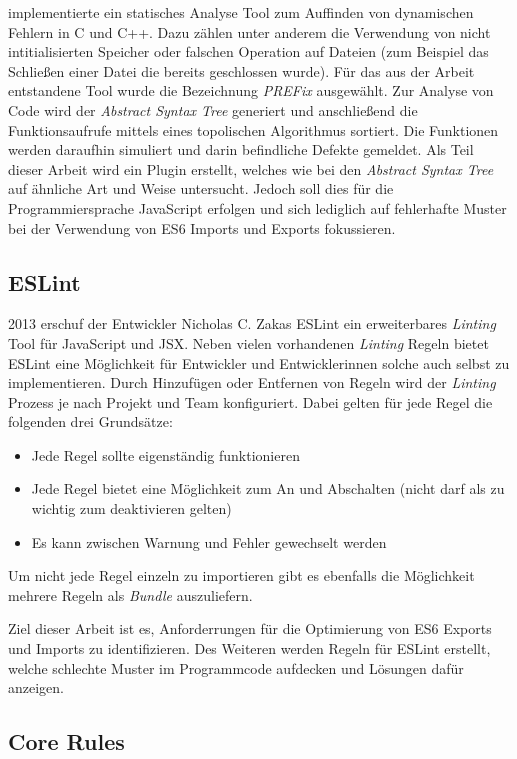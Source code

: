 \textcite{Bush2000} implementierte ein statisches Analyse Tool zum Auffinden von dynamischen Fehlern in C und C++. Dazu zählen unter anderem die Verwendung von nicht intitialisierten Speicher oder falschen Operation auf Dateien (zum Beispiel das Schließen einer Datei die bereits geschlossen wurde). Für das aus der Arbeit entstandene Tool wurde die Bezeichnung \textit{PREFix} ausgewählt. Zur Analyse von Code wird der \textit{Abstract Syntax Tree} generiert und anschließend die Funktionsaufrufe mittels eines topolischen Algorithmus sortiert. Die Funktionen werden daraufhin simuliert und darin befindliche Defekte gemeldet. Als Teil dieser Arbeit wird ein Plugin erstellt, welches wie bei \textcite{Bush2000} den \textit{Abstract Syntax Tree} auf ähnliche Art und Weise untersucht. Jedoch soll dies für die Programmiersprache JavaScript erfolgen und sich lediglich auf fehlerhafte Muster bei der Verwendung von ES6 Imports und Exports fokussieren.

\subsection{ESLint}
2013 erschuf der Entwickler Nicholas C. Zakas ESLint ein erweiterbares \textit{Linting} Tool für JavaScript und JSX. Neben vielen vorhandenen \textit{Linting} Regeln bietet  ESLint eine Möglichkeit für Entwickler und Entwicklerinnen solche auch selbst zu implementieren. Durch Hinzufügen oder Entfernen von Regeln wird der \textit{Linting} Prozess je nach Projekt und Team konfiguriert. Dabei gelten für jede Regel die folgenden drei Grundsätze:
\begin{itemize}
  \item Jede Regel sollte eigenständig funktionieren
  \item Jede Regel bietet eine Möglichkeit zum An und Abschalten (nicht darf als zu wichtig zum deaktivieren gelten)
  \item Es kann zwischen Warnung und Fehler gewechselt werden
\end{itemize}
Um nicht jede Regel einzeln zu importieren gibt es ebenfalls die Möglichkeit mehrere Regeln als \textit{Bundle} auszuliefern. \autocite{ESLintAbout}

Ziel dieser Arbeit ist es, Anforderrungen für die Optimierung von ES6 Exports und Imports zu identifizieren. Des Weiteren werden Regeln für ESLint erstellt, welche schlechte Muster im Programmcode aufdecken und Lösungen dafür anzeigen. \autocite{ESLintAbout}

\subsection{Core Rules}
\label{subsubsection:core_rules}

